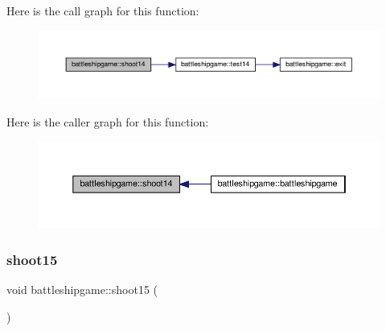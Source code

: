 Here is the call graph for this function\+:
\nopagebreak
\begin{figure}[H]
\begin{center}
\leavevmode
\includegraphics[width=350pt]{classbattleshipgame_a2e1f24999099b5c301253a244d46c663_cgraph}
\end{center}
\end{figure}
Here is the caller graph for this function\+:
\nopagebreak
\begin{figure}[H]
\begin{center}
\leavevmode
\includegraphics[width=350pt]{classbattleshipgame_a2e1f24999099b5c301253a244d46c663_icgraph}
\end{center}
\end{figure}
\mbox{\label{classbattleshipgame_a3b024b5ad7c747303c00b740f0921751}} 
\subsubsection{\texorpdfstring{shoot15}{shoot15}}
{\footnotesize\ttfamily void battleshipgame\+::shoot15 (\begin{DoxyParamCaption}{ }\end{DoxyParamCaption})\hspace{0.3cm}{\ttfamily [slot]}}

